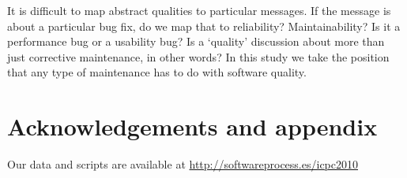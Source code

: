 \documentclass[10pt, conference, compsocconf]{IEEEtran}
\begin{document}
It is difficult to map abstract qualities to particular messages. If the message is about a particular bug fix, do we map that to reliability? Maintainability? Is it a performance bug or a usability bug? Is a `quality' discussion about more than just corrective maintenance, in other words? In this study we take the position that any type of maintenance has to do with software quality.

\section{Acknowledgements and appendix}
Our data and scripts are available at \url{http://softwareprocess.es/icpc2010}



\end{document}
